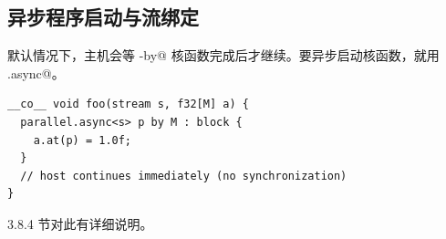\subsection*{异步程序启动与流绑定}

默认情况下，主机会等 \co@parallel-by@ 核函数完成后才继续。要异步启动核函数，就用 \co@parallel.async@。

\begin{lstlisting}[language=croqtile,caption={异步程序启动与流绑定}]
__co__ void foo(stream s, f32[M] a) {
  parallel.async<s> p by M : block {
    a.at(p) = 1.0f;
  }
  // host continues immediately (no synchronization)
}
\end{lstlisting}

3.8.4 节对此有详细说明。
